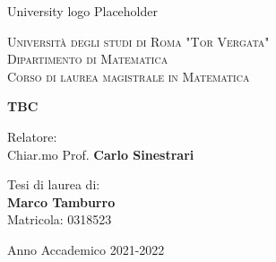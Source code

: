 \thispagestyle{empty}
\begin{center}
	University logo Placeholder\vspace{70pt}
\end{center}

\begin{center}
\textsc{Università degli studi di Roma "Tor Vergata" \\ Dipartimento di Matematica \\ Corso di laurea magistrale in Matematica}
\end{center}
\vspace{25pt}
\begin{center}
\textbf{\Large{TBC}}
\end{center}
\vspace{60pt}
\begin{flushleft}
Relatore: \\ Chiar.mo Prof. \textbf{Carlo Sinestrari}
\end{flushleft}
\vspace{70pt}
\begin{flushright}
Tesi di laurea di: \\ \textbf{Marco Tamburro}\\
\vspace{1pt}
Matricola: 0318523
\end{flushright}
\thispagestyle{empty}
\vspace{109pt}
\begin{center}
	Anno Accademico 2021-2022
\end{center}
\newpage